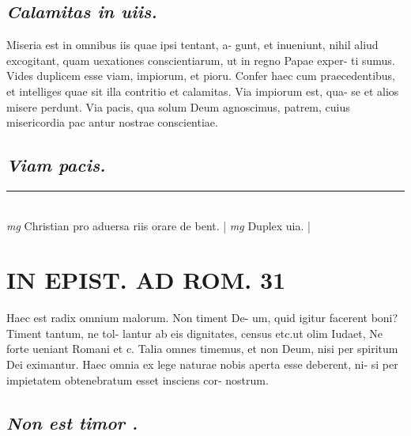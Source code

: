 \documentclass{article}
\begin{document}
\begin{pages}
\subsection*{\textit{Calamitas in uiis. }}\pstart Miseria est in omnibus iis quae ipsi tentant, a- gunt, et inueniunt, nihil aliud excogitant, quam uexationes conscientiarum, ut in regno Papae exper- ti sumus.   \pend\pstart Vides duplicem esse viam, impiorum, et pioru.  Confer haec cum praecedentibus, et intelliges quae sit illa contritio et calamitas. Via impiorum est, qua- se et alios misere perdunt. Via pacis, qua solum Deum agnoscimus, patrem, cuius misericordia pac antur nostrae conscientiae.   \pend
{}
{}
\subsection*{\textit{Viam pacis. }}
\vspace{0.5cm}\noindent
\vspace{0.2cm}\rule{1cm}{0.2pt}\\ 
\hspace{0.2cm}\textit{mg}
\footnotesize Christian pro aduersa riis orare de bent.  
\normalsize| 
\hspace{0.2cm}\textit{mg}
\footnotesize Duplex uia.  
\normalsize| 
\section*{IN EPIST. AD ROM.  31 }
\marginpar{[ p.]}\pstart Haec est radix omnium malorum. Non timent De- um, quid igitur facerent boni? Timent tantum, ne tol- lantur ab eis dignitates, census etc.ut olim Iudaet, Ne forte ueniant Romani et c. Talia omnes timemus, et non Deum, nisi per spiritum Dei eximantur. Haec omnia ex lege naturae nobis aperta esse deberent, ni- si per impietatem obtenebratum esset insciens cor- nostrum.   \pend
{}
{}
\subsection*{\textit{Non est timor . }}
{}

\end{pages}
\end{document}
